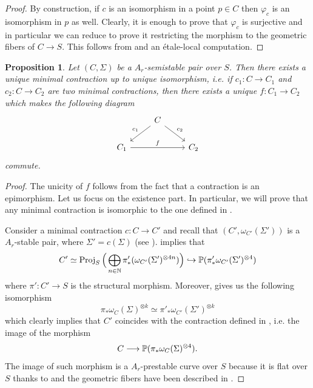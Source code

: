 \documentclass{alggeom}
\numberwithin{equation}{section}
\numberwithin{subsection}{section}
\newtheorem{proposition}[theorem]{Proposition}
\theoremstyle{definition}
\theoremstyle{remark}
\newcommand{\proj}{\operatorname{Proj}}
\begin{document}
\begin{proof}
  By construction, if $c$ is an isomorphism in a point $p \in C$ then $\varphi_c$ is an isomorphism in $p$ as well. Clearly, it is enough to prove that $\varphi_c$ is surjective and in particular we can reduce to prove it restricting the morphism to the geometric fibers of $C\rightarrow S$. This follows from  and an \'etale-local computation.
\end{proof}



\begin{proposition}\label{prop:unique-contrac}
 Let $(C,\Sigma)$ be a $A_r$-semistable pair over $S$. Then there exists a unique minimal contraction up to unique isomorphism, i.e. if $c_1:C \rightarrow C_1$ and $c_2:C \rightarrow C_2$ are two minimal contractions, then there exists a unique $f:C_1\rightarrow C_2$ which makes the following diagram
 $$
\begin{tikzcd}
                    & C \arrow[ld, "c_1"'] \arrow[rd, "c_2"] &     \\
C_1 \arrow[rr, "f"] &                                        & C_2
\end{tikzcd}
$$ 
commute.
\end{proposition}

\begin{proof}
 The unicity of $f$ follows from the fact that a contraction is an epimorphism. Let us focus on the existence part. In particular, we will prove that any minimal contraction is isomorphic to the one defined in . 
 
 Consider a minimal contraction $c:C\rightarrow C'$ and recall that $(C',\omega_{C'}(\Sigma'))$ is a $A_r$-stable pair, where $\Sigma'=c(\Sigma)$ (see ).  implies that 
 $$ C' \simeq \proj_S \Big(\bigoplus_{n \in \NN} \pi'_*(\omega_{C'}(\Sigma')^{\otimes 4n})\Big) \hookrightarrow \PP(\pi'_*\omega_{C'}(\Sigma')^{\otimes 4})$$ 
 where $\pi':C' \rightarrow S$ is the structural morphism. Moreover,  gives us the following isomorphism 
 $$ \pi_*\omega_{C}(\Sigma)^{\otimes k}\simeq \pi'_*\omega_{C'}(\Sigma')^{\otimes k}$$
 which clearly implies that $C'$ coincides with the contraction defined in , i.e. the image of the morphism 
 $$ C\longrightarrow \mathbb{P}(\pi_*\omega_C(\Sigma)^{\otimes 4}).$$
 The image of such morphism is a $A_r$-prestable curve over $S$ because it is flat over $S$ thanks to  and the geometric fibers have been described in .
\end{proof}
\end{document}
